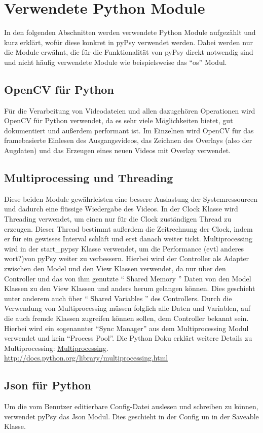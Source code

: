 \documentclass[a4paper,draft]{scrartcl}
\begin{document}
\section{Verwendete Python Module}
In den folgenden Abschnitten werden verwendete Python Module aufgezählt und kurz erklärt, wofür diese konkret in pyPsy verwendet werden. Dabei werden nur die Module erwähnt, die für die Funktionalität von pyPsy direkt notwendig sind und nicht häufig verwendete Module wie beispielsweise das "`os"' Modul. 
\subsection{OpenCV für Python}
Für die Verarbeitung von Videodateien und allen dazugehören Operationen wird OpenCV für Python verwendet, da es sehr viele Möglichkeiten bietet, gut dokumentiert und außerdem performant ist. 
Im Einzelnen wird OpenCV für das framebasierte Einlesen des Ausgangsvideos, das Zeichnen des Overlays (also der Augdaten) und das Erzeugen eines neuen Videos mit Overlay verwendet.
\subsection{Multiprocessing und Threading}
Diese beiden Module gewährleisten eine bessere Auslastung der Systemressourcen und dadurch eine flüssige Wiedergabe des Videos. 
In der Clock Klasse wird Threading verwendet, um einen nur für die Clock zuständigen Thread zu erzeugen. Dieser Thread bestimmt außerdem die Zeitrechnung der Clock, indem er für ein gewisses Interval schläft und erst danach weiter tickt. 
Multiprocessing wird in der start\_pypsy Klasse verwendet, um die Performance (evtl anderes wort?)von pyPsy weiter zu verbessern. Hierbei wird der Controller als Adapter zwischen den Model und den View Klassen verwendet, da nur über den Controller und das von ihm genutzte "` Shared Memory "' Daten von den Model Klassen zu den View Klassen und anders herum gelangen können. Dies geschieht unter anderem auch über "` Shared Variables "' des Controllers. 
Durch die Verwendung von Multiprocessing müssen folglich alle Daten und Variablen, auf die auch fremde Klassen zugreifen können sollen, dem Controller bekannt sein. Hierbei wird ein sogenannter "`Sync Manager"' aus dem Multiprocessing Modul verwendet und kein "`Process Pool"'.
Die Python Doku erklärt weitere Details zu Multiprocessing: \href{http://docs.python.org/library/multiprocessing.html}
{Multiprocessing}.
\url{http://docs.python.org/library/multiprocessing.html}
\subsection{Json für Python}
Um die vom Benutzer editierbare Config-Datei auslesen und schreiben zu können, verwendet pyPsy das Json Modul. Dies geschieht in der Config un in der Saveable Klasse. 
\end{document}
